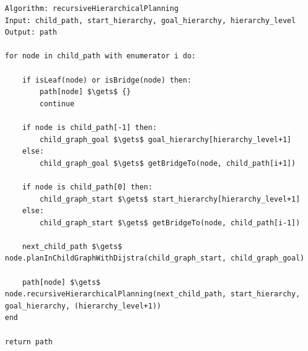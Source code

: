 \begin{lstlisting}[float=h]
Algorithm: recursiveHierarchicalPlanning
Input: child_path, start_hierarchy, goal_hierarchy, hierarchy_level
Output: path

for node in child_path with enumerator i do:

    if isLeaf(node) or isBridge(node) then:
        path[node] $\gets$ {}
        continue

    if node is child_path[-1] then:
        child_graph_goal $\gets$ goal_hierarchy[hierarchy_level+1]
    else:
        child_graph_goal $\gets$ getBridgeTo(node, child_path[i+1])
        
    if node is child_path[0] then:
        child_graph_start $\gets$ start_hierarchy[hierarchy_level+1]
    else:
        child_graph_start $\gets$ getBridgeTo(node, child_path[i-1])

    next_child_path $\gets$ node.planInChildGraphWithDijstra(child_graph_start, child_graph_goal)

    path[node] $\gets$ node.recursiveHierarchicalPlanning(next_child_path, start_hierarchy, goal_hierarchy, (hierarchy_level+1))
end

return path
\end{lstlisting}

